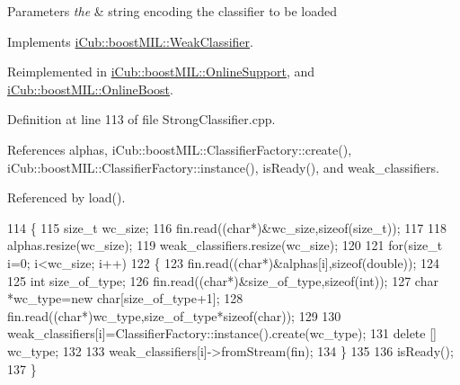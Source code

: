 \begin{DoxyParams}{Parameters}
{\em the} & string encoding the classifier to be loaded \\
\hline
\end{DoxyParams}


Implements \hyperlink{classiCub_1_1boostMIL_1_1WeakClassifier_ab33627f7dd2c377635f653add1a55107}{i\+Cub\+::boost\+M\+I\+L\+::\+Weak\+Classifier}.



Reimplemented in \hyperlink{classiCub_1_1boostMIL_1_1OnlineSupport_a6f160fca47748fd00c99daf7a842304c}{i\+Cub\+::boost\+M\+I\+L\+::\+Online\+Support}, and \hyperlink{classiCub_1_1boostMIL_1_1OnlineBoost_a4258aee4c77ab8633765167389c30fbb}{i\+Cub\+::boost\+M\+I\+L\+::\+Online\+Boost}.



Definition at line 113 of file Strong\+Classifier.\+cpp.



References alphas, i\+Cub\+::boost\+M\+I\+L\+::\+Classifier\+Factory\+::create(), i\+Cub\+::boost\+M\+I\+L\+::\+Classifier\+Factory\+::instance(), is\+Ready(), and weak\+\_\+classifiers.



Referenced by load().


\begin{DoxyCode}
114 \{
115     \textcolor{keywordtype}{size\_t} wc\_size;
116     fin.read((\textcolor{keywordtype}{char}*)&wc\_size,\textcolor{keyword}{sizeof}(\textcolor{keywordtype}{size\_t}));
117 
118     alphas.resize(wc\_size);
119     weak_classifiers.resize(wc\_size);
120 
121     \textcolor{keywordflow}{for}(\textcolor{keywordtype}{size\_t} i=0; i<wc\_size; i++)
122     \{
123         fin.read((\textcolor{keywordtype}{char}*)&alphas[i],\textcolor{keyword}{sizeof}(\textcolor{keywordtype}{double}));
124 
125         \textcolor{keywordtype}{int} size\_of\_type;
126         fin.read((\textcolor{keywordtype}{char}*)&size\_of\_type,\textcolor{keyword}{sizeof}(\textcolor{keywordtype}{int}));
127         \textcolor{keywordtype}{char} *wc\_type=\textcolor{keyword}{new} \textcolor{keywordtype}{char}[size\_of\_type+1];
128         fin.read((\textcolor{keywordtype}{char}*)wc\_type,size\_of\_type*\textcolor{keyword}{sizeof}(\textcolor{keywordtype}{char}));
129 
130         weak_classifiers[i]=ClassifierFactory::instance().create(wc\_type);
131         \textcolor{keyword}{delete} [] wc\_type;
132 
133         weak_classifiers[i]->fromStream(fin);
134     \}
135 
136     isReady();
137 \}
\end{DoxyCode}
